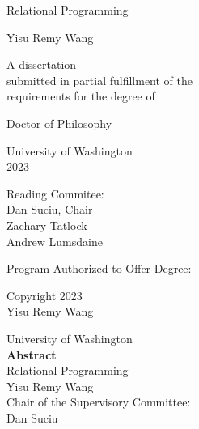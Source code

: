 \documentclass[12pt]{book}
\title{\mytitle}
\author{\myauthor}
\theoremstyle{definition}
\def\mytitle{Relational Programming}
\def\myauthor{Yisu Remy Wang}
\def\year{2023}
\begin{document}
\pagestyle{empty}

\begin{center}
  {\huge \mytitle}
  \vfill

  {\Large \myauthor}
  \vfill

  \begin{spacing}{1}
    A dissertation \\
    submitted in partial fulfillment of the \\
    requirements for the degree of
  \end{spacing}
  \vfill

  Doctor of Philosophy
  \vfill

  University of Washington \\
  \year
  \vfill

  Reading Commitee: \\
  Dan Suciu, Chair \\
  Zachary Tatlock \\
  Andrew Lumsdaine
  \vfill
  \begin{spacing}{1}
    Program Authorized to Offer Degree: \\
    \cse
  \end{spacing}
  \clearpage

  \textcopyright{} Copyright \year\\
  \myauthor
  \clearpage
\end{center}

\pagestyle{plain}
\setcounter{page}{1}

\begin{center}
  University of Washington \\[1em]
  \textbf{Abstract}        \\[1em]
  \mytitle                 \\[1em]
  \myauthor                \\[1em]

  Chair of the Supervisory Committee: \\[-0.5em]
  Dan Suciu \\[-0.5em]
  \pgas
  \\[2em]
\end{center}


\begin{spacing}{1.5}
  \tableofcontents
\end{spacing}
\end{document}
